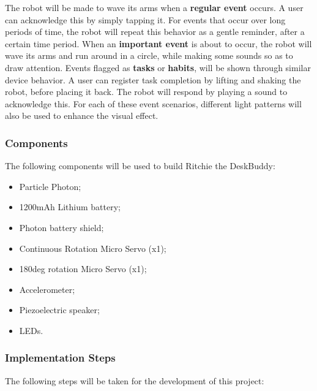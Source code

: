 \documentclass{sigchi-ext}
\begin{document}
The robot will be made to wave its arms when a \textbf{regular event} occurs. A
user can acknowledge this by simply tapping it. For events that occur over long
periods of time, the robot will repeat this behavior as a gentle reminder,
after a certain time period. When an \textbf{important event} is about to
occur, the robot will wave its arms and run around in a circle, while making
some sounds so as to draw attention. Events flagged as \textbf{tasks} or
\textbf{habits}, will be shown through similar device behavior. A user can
register task completion by lifting and shaking the robot, before placing it
back. The robot will respond by playing a sound to acknowledge this. For each
of these event scenarios, different light patterns will also be used to enhance
the visual effect.

\subsubsection{Components}

The following components will be used to build Ritchie the DeskBuddy:

\begin{itemize}
  \item Particle Photon;
  \item 1200mAh Lithium battery;
  \item Photon battery shield;
  \item Continuous Rotation Micro Servo (x1);
  \item 180deg rotation Micro Servo (x1);
  \item Accelerometer;
  \item Piezoelectric speaker;
  \item LEDs.
\end{itemize}

\subsubsection{Implementation Steps}

The following steps will be taken for the development of this project:
\end{document}
